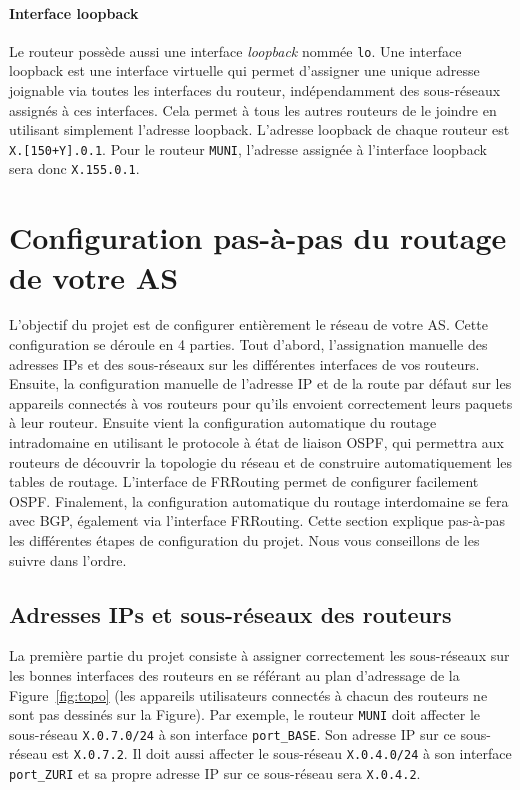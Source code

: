 \documentclass[a4paper, 11pt]{article}
\begin{document}
\paragraph*{Interface loopback}
Le routeur possède aussi
une interface \textit{loopback} nommée \texttt{lo}. Une interface loopback
est une interface virtuelle qui permet d'assigner une unique adresse
joignable via toutes les interfaces du routeur, indépendamment des
sous-réseaux assignés à ces interfaces. Cela permet à tous les autres
routeurs de le joindre en utilisant simplement l'adresse loopback.
L'adresse loopback de chaque routeur est \texttt{X.[150+Y].0.1}.
Pour le routeur \texttt{MUNI}, l'adresse assignée à l'interface
loopback sera donc \texttt{X.155.0.1}.


\section{Configuration pas-à-pas du routage de votre AS}


L'objectif du projet est de configurer entièrement le réseau de votre AS.
Cette configuration se déroule en 4 parties. Tout d'abord, l'assignation
manuelle des adresses IPs et des sous-réseaux sur les différentes interfaces
de vos routeurs. Ensuite, la configuration manuelle de l'adresse IP et de la
route par défaut sur les appareils connectés à vos routeurs pour qu'ils
envoient correctement leurs paquets à leur routeur.
Ensuite vient la configuration automatique du routage intradomaine
en utilisant le protocole à état de liaison OSPF, qui permettra aux routeurs
de découvrir la topologie du réseau et de construire automatiquement
les tables de routage. L'interface de FRRouting permet de configurer
facilement OSPF. Finalement, la configuration automatique du routage
interdomaine se fera avec BGP, également via l'interface FRRouting.
Cette section explique pas-à-pas les différentes étapes de configuration
du projet. Nous vous conseillons de les suivre dans l'ordre.

\subsection{Adresses IPs et sous-réseaux des routeurs}

La première partie du projet consiste à assigner correctement les
sous-réseaux sur les bonnes interfaces des routeurs en se référant au
plan d'adressage de la Figure~\ref{fig:topo} (les appareils utilisateurs
connectés à chacun des routeurs ne sont pas dessinés sur la Figure).
Par exemple, le routeur \texttt{MUNI} doit affecter le sous-réseau
\texttt{X.0.7.0/24} à son interface \texttt{port\_BASE}. Son adresse
IP sur ce sous-réseau est \texttt{X.0.7.2}. Il doit aussi affecter le
sous-réseau \texttt{X.0.4.0/24} à son interface \texttt{port\_ZURI} et
sa propre adresse IP sur ce sous-réseau sera \texttt{X.0.4.2}.
\end{document}
